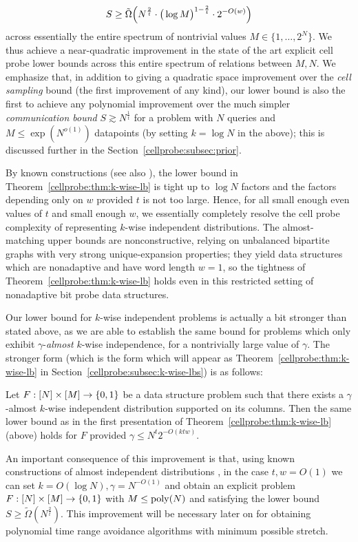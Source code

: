 \[
S \geq \tilde{\Omega}\Bigl( N^{\frac{2}{t}} \cdot \big(\log M\big)^{1 - \frac{2}{t}} \cdot 2^{-O(w)}\Bigr)
\]
across essentially the entire spectrum of nontrivial values $M \in \{1,\ldots,2^N\}$. We thus achieve a near-quadratic improvement in the state of the art explicit cell probe lower bounds across this entire spectrum of relations between $M,N$. 
We emphasize that, in addition to giving a quadratic space improvement over the \emph{cell sampling} bound (the first improvement of any kind), our lower bound is also the first to achieve any polynomial improvement over the much simpler \emph{communication bound} $S \gtrsim N^{\frac{1}{t}}$ for a problem with $N$ queries and $M \leq \exp(N^{o(1)})$ datapoints (by setting $k=\log N$ in the above); this is discussed further in the Section~\ref{cellprobe:subsec:prior}. 

By known constructions \cite{Siegel89,Siegel04} (see also \cite{pudlak}), the lower bound in Theorem~\ref{cellprobe:thm:k-wise-lb} is tight up to $\log N$ factors and the factors depending only on $w$ provided $t$ is not too large. Hence, for all small enough even values of $t$ and small enough $w$, we essentially completely resolve the cell probe complexity of representing $k$-wise independent distributions. The almost-matching upper bounds are nonconstructive, relying on unbalanced bipartite graphs with very strong unique-expansion properties; they yield data structures which are nonadaptive and have word length $w=1$, so the tightness of Theorem~\ref{cellprobe:thm:k-wise-lb} holds even in this restricted setting of nonadaptive bit probe data structures.

Our lower bound for $k$-wise independent problems is actually a bit stronger than stated above, as we are able to establish the same bound for problems which only exhibit $\gamma$-\emph{almost} $k$-wise independence, for a nontrivially large value of $\gamma$. The stronger form (which is the form which will appear as Theorem~\ref{cellprobe:thm:k-wise-lb} in Section~\ref{cellprobe:subsec:k-wise-lbs}) is as follows:
\begin{theorem*}
% 
Let $F: [N] \times [M] \to \{0,1\}$ be a data structure problem such that there exists a $\gamma$-almost $k$-wise independent distribution supported on its columns. 
Then the same lower bound as in the first presentation of Theorem~\ref{cellprobe:thm:k-wise-lb} (above) holds for $F$ provided $\gamma \leq  N^{t} 2^{-O(ktw)}$.
\end{theorem*}
An important consequence of this improvement is that, using known constructions of almost independent distributions \cite{naornaor}, in the case $t,w=O(1)$ we can set $k= O(\log N), \gamma = N^{-O(1)}$ and obtain an explicit problem $F: [N] \times [M] \to \{0,1\}$ with $M \leq \mathrm{poly}(N)$ and satisfying the lower bound $S \geq \tilde{\Omega}(N^{\frac{2}{t}})$.
This improvement will be necessary later on for obtaining polynomial time range avoidance algorithms with minimum possible stretch. 

